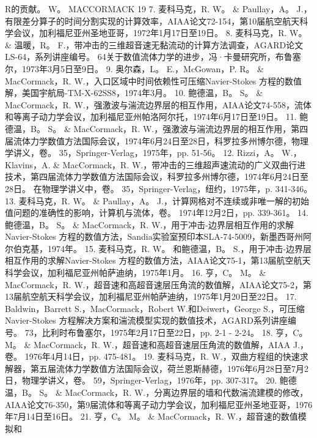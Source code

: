 \documentclass[UTF8,11pt,a4paper,openany,fontset=fandol]{ctexbook}
\begin{document}
R的贡献。 W。 MACCORMACK 19 7. 麦科马克，R. W。 \& Paullay，A。 J.，有限差分算子的时间分割实现的计算效率，AIAA论文72-154，第10届航空航天科学会议，加利福尼亚州圣地亚哥，1972年1月17日至19日。 8. 麦科马克，R. W。 \& 温暖，R。 F.，带冲击的三维超音速无黏流动的计算方法调查，AGARD论文LS-64，系列讲座编号。 64关于数值流体力学的进步，冯·卡曼研究所，布鲁塞尔，1973年3月5日至9日。 9. 奥尔森，L。 E.，McGowan，P. R。 \& MacCormack，R. W.，入口区域中时间依赖性可压缩Navier-Stokes 方程的数值解，美国宇航局-TM-X-62SS8，1974年3月。 10. 鲍德温，B。 S。 \& MacCormack，R. W.，强激波与湍流边界层的相互作用，AIAA论文74-558，流体和等离子动力学会议，加利福尼亚州帕洛阿尔托，1974年6月17日至19日。 11. 鲍德温，B。 S。 \& MacCormack，R. W.，强激波与湍流边界层的相互作用，第四届流体力学数值方法国际会议，1974年6月24日至28日，科罗拉多州博尔德，物理学讲义，卷。 35，Springer-Verlag，1975年，pp. 51-56。 12. Rizzi，A。 W.，Klavins，A. \& MacCormack，R. W.，带冲击的三维超声速流动的广义双曲行进技术，第四届流体力学数值方法国际会议，科罗拉多州博尔德，1974年6月24日至28日。 在物理学讲义中，卷。 35，Springer-Verlag，纽约，1975年，p. 341-346。 13. 麦科马克，R. W。 \& Paullay，A。 J.，计算网格对不连续或非唯一解的初始值问题的准确性的影响，计算机与流体，卷。 1974年12月2日，pp. 339-361。 14. 鲍德温，B。 S。 \& MacCormack，R. W.，用于冲击-边界层相互作用的求解Navier-Stokes 方程的数值方法，Sandia实验室预印本SLA-74-5009，新墨西哥州阿尔伯克基，1974年。 15. 麦科马克，R. W。 和鲍德温，B。 S.，用于冲击-边界层相互作用的求解Navier-Stokes 方程的数值方法，AIAA论文75-1，第13届航空航天科学会议，加利福尼亚州帕萨迪纳，1975年1月。 16. 亨，C。 M。 \& MacCormack，R. W.，超音速和高超音速层压角流的数值解，AIAA论文75-2，第13届航空航天科学会议，加利福尼亚州帕萨迪纳，1975年1月20日至22日。 17. Baldwin，Barrett S.，MacCormack，Robert W.和Deiwert，George S.，可压缩Navier-Stokes 方程解决方案和湍流模型实现的数值技术，AGARD系列讲座编号。 73，比利时布鲁塞尔，1975年2月17日至22日，pp. 2-1 - 2-24。 18. 亨，C。 M。 \& MacCormack，R. W.，超音速和高超音速层压角流的数值解，AIAA J.，卷。 1976年4月14日，pp. 475-481。 19. 麦科马克，R. W.，双曲方程组的快速求解器，第五届流体力学数值方法国际会议，荷兰恩斯赫德，1976年6月28日至7月2日，物理学讲义，卷。 59，Springer-Verlag，1976年，pp. 307-317。 20. 鲍德温，B。 S。 \& MacCormack，R. W.，分离边界层的墙和代数湍流建模的修改，AIAA论文76-350，第9届流体和等离子动力学会议，加利福尼亚州圣地亚哥，1976年7月14日至16日。 21. 亨，C。 M。 \& MacCormack，R. W.，超音速的数值模拟和
\end{document}

